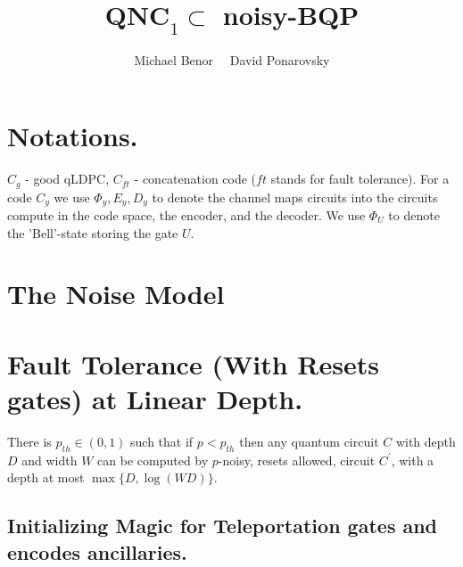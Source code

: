 \documentclass[manuscript,screen,review]{acmart}
\begin{document}

\title{ $\textbf{QNC}_{1} \subset $ noisy-\textbf{BQP}}
\author{Michael Benor \ \ David Ponarovsky}
\maketitle

\newcommand*{\Mbas}{\mathcal{X}^\prime}
\newcommand*{\bas}{\mathcal{X}}
\newcommand*{\sMbas}{\Mbas}
\newcommand*{\QQ}{C_{X}/C_{Z}^\perp }
\newcommand*{\trig}{ Triorthogonal }
\newcommand*{\Hyp}{ Hyperproduct }
\newcommand*{\Cin}{ C_{\text{initial}} }
\newcommand*{\Ctan}{ C_{\text{Tan}} }





\section{ Notations. }
$C_{g}$ - good qLDPC, $C_{ft}$ - concatenation code ($ft$ stands for fault tolerance). For a code $C_{y}$ we use $\Phi_{y}, E_{y}, D_{y}$ to denote the channel maps circuits into the circuits compute in the code space, the encoder, and the decoder. We use $\Phi_{U}$ to denote the 'Bell'-state storing the gate $U$. 


\section{ The Noise Model }


\section{ Fault Tolerance (With Resets gates) at Linear Depth. } 

\begin{claim}
  There is $p_{th} \in (0,1)$ such that if $p < p_{th}$ then any quantum circuit $C$ with depth $D$ and width $W$ can be computed by $p$-noisy, resets allowed, circuit $C^{\prime}$, with a depth at most $\max{ \{D, \log(WD) \} }$. 
\end{claim}


\subsection{Initializing Magic for Teleportation gates and encodes ancillaries.}
\end{document}
